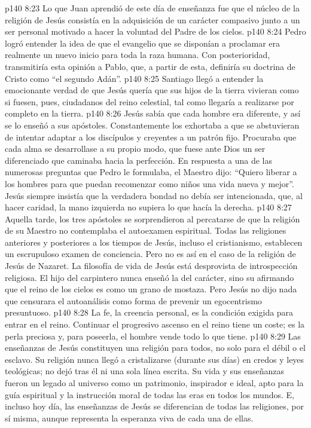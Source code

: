 \vs p140 8:23 \pc Lo que Juan aprendió de este día de enseñanza fue que el núcleo de la religión de Jesús consistía en la adquisición de un carácter compasivo junto a un ser personal motivado a hacer la voluntad del Padre de los cielos.
\vs p140 8:24 Pedro logró entender la idea de que el evangelio que se disponían a proclamar era realmente un nuevo inicio para toda la raza humana. Con posterioridad, transmitiría esta opinión a Pablo, que, a partir de esta, definiría su doctrina de Cristo como “el segundo Adán”.
\vs p140 8:25 Santiago llegó a entender la emocionante verdad de que Jesús quería que sus hijos de la tierra vivieran como si fuesen, pues, ciudadanos del reino celestial, tal como llegaría a realizarse por completo en la tierra.
\vs p140 8:26 \pc Jesús sabía que cada hombre era diferente, y así se lo enseñó a sus apóstoles. Constantemente los exhortaba a que se abstuvieran de intentar adaptar a los discípulos y creyentes a un patrón fijo. Procuraba que cada alma se desarrollase a su propio modo, que fuese ante Dios un ser diferenciado que caminaba hacia la perfección. En respuesta a una de las numerosas preguntas que Pedro le formulaba, el Maestro dijo: “Quiero liberar a los hombres para que puedan recomenzar como niños una vida nueva y mejor”. Jesús siempre insistía que la verdadera bondad no debía ser intencionada, que, al hacer caridad, la mano izquierda no supiera lo que hacía la derecha.
\vs p140 8:27 Aquella tarde, los tres apóstoles se sorprendieron al percatarse de que la religión de su Maestro no contemplaba el autoexamen espiritual. Todas las religiones anteriores y posteriores a los tiempos de Jesús, incluso el cristianismo, establecen un escrupuloso examen de conciencia. Pero no es así en el caso de la religión de Jesús de Nazaret. La filosofía de vida de Jesús está desprovista de introspección religiosa. El hijo del carpintero nunca enseñó la  del carácter, sino su  afirmando que el reino de los cielos es como un grano de mostaza. Pero Jesús no dijo nada que censurara el autoanálisis como forma de prevenir un egocentrismo presuntuoso.
\vs p140 8:28 La fe, la creencia personal, es la condición exigida para entrar en el reino. Continuar el progresivo ascenso en el reino tiene un coste; es la perla preciosa y, para poseerla, el hombre vende todo lo que tiene.
\vs p140 8:29 Las enseñanzas de Jesús constituyen una religión para todos, no solo para el débil o el esclavo. Su religión nunca llegó a cristalizarse (durante sus días) en credos y leyes teológicas; no dejó tras él ni una sola línea escrita. Su vida y sus enseñanzas fueron un legado al universo como un patrimonio, inspirador e ideal, apto para la guía espiritual y la instrucción moral de todas las eras en todos los mundos. E, incluso hoy día, las enseñanzas de Jesús se diferencian de todas las religiones, por sí misma, aunque representa la esperanza viva de cada una de ellas.

